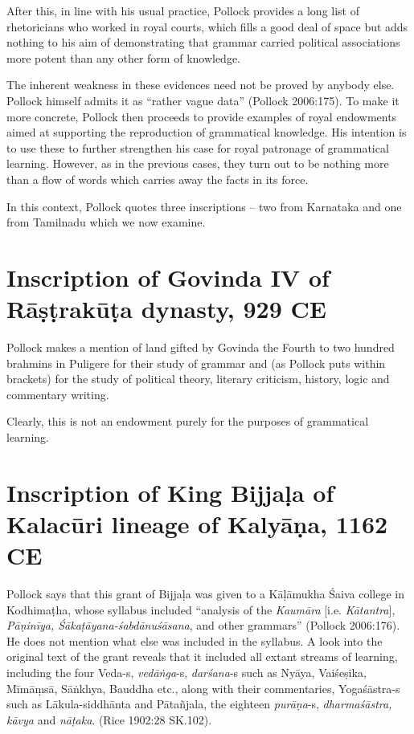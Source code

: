 \newpage

After this, in line with his usual practice, Pollock provides a long list of rhetoricians who worked in royal courts, which fills a good deal of space but adds nothing to his aim of demonstrating that grammar carried political associations more potent than any other form of knowledge.

The inherent weakness in these evidences need not be proved by anybody else. Pollock himself admits it as ``rather vague data'' (Pollock 2006:175). To make it more concrete, Pollock then proceeds to provide examples of royal endowments aimed at supporting the reproduction of grammatical knowledge. His intention is to use these to further strengthen his case for royal patronage of grammatical learning. However, as in the previous cases, they turn out to be nothing more than a flow of words which carries away the facts in its force.

In this context, Pollock quotes three inscriptions -- two from Karnataka and one from Tamilnadu which we now examine.

\section{Inscription of Govinda IV of Rāṣṭrakūṭa dynasty, 929 CE}\label{chap3-sec16}

Pollock makes a mention of land gifted by Govinda the Fourth to two hundred brahmins in Puligere for their study of grammar and (as Pollock puts within brackets) for the study of political theory, literary criticism, history, logic and commentary writing. 

Clearly, this is not an endowment purely for the purposes of grammatical learning.

\section{Inscription of King Bijjaḷa of Kalacūri lineage of Kalyāṇa, 1162 CE}\label{chap3-sec17}

Pollock says that this grant of Bijjaḷa was given to a Kāḷāmukha Śaiva college in Kodhimaṭha, whose syllabus included ``analysis of the {\sl Kaumāra} [i.e. {\sl Kātantra}], {\sl Pāṇinīya, Śākaṭāyana-śabdānuśāsana}, and other grammars'' (Pollock 2006:176). He does not mention what else was included in the syllabus. A look into the original text of the grant reveals that it included all extant streams of learning, including the four Veda-s, {\sl vedāṅga}-s, {\sl darśana}-s such as Nyāya, Vaiśeṣika, Mīmāṃsā, Sāṅkhya, Bauddha etc., along with their commentaries, Yogaśāstra-s such as Lākula-siddhānta and Pātañjala, the eighteen {\sl purāṇa}-s, {\sl dharmaśāstra, kāvya} and {\sl nāṭaka}. (Rice 1902:28 SK.102).

